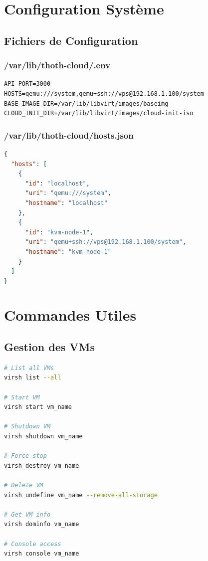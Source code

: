 \documentclass[12pt,a4paper]{article}
\begin{document}
\section{Configuration Système}

\subsection{Fichiers de Configuration}

\subsubsection{/var/lib/thoth-cloud/.env}

\begin{lstlisting}[caption=Fichier d'environnement]
API_PORT=3000
HOSTS=qemu:///system,qemu+ssh://vps@192.168.1.100/system
BASE_IMAGE_DIR=/var/lib/libvirt/images/baseimg
CLOUD_INIT_DIR=/var/lib/libvirt/images/cloud-init-iso
\end{lstlisting}

\subsubsection{/var/lib/thoth-cloud/hosts.json}

\begin{lstlisting}[language=json, caption=Configuration des hôtes]
{
  "hosts": [
    {
      "id": "localhost",
      "uri": "qemu:///system",
      "hostname": "localhost"
    },
    {
      "id": "kvm-node-1",
      "uri": "qemu+ssh://vps@192.168.1.100/system",
      "hostname": "kvm-node-1"
    }
  ]
}
\end{lstlisting}

\section{Commandes Utiles}

\subsection{Gestion des VMs}

\begin{lstlisting}[language=bash, caption=Commandes virsh]
# List all VMs
virsh list --all

# Start VM
virsh start vm_name

# Shutdown VM
virsh shutdown vm_name

# Force stop
virsh destroy vm_name

# Delete VM
virsh undefine vm_name --remove-all-storage

# Get VM info
virsh dominfo vm_name

# Console access
virsh console vm_name
\end{lstlisting}
\end{document}
